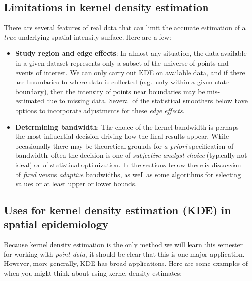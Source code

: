 \documentclass[
]{book}
\providecommand{\tightlist}{%
  \setlength{\itemsep}{0pt}\setlength{\parskip}{0pt}}
\begin{document}
\hypertarget{limitations-in-kernel-density-estimation}{%
\subsection{Limitations in kernel density estimation}\label{limitations-in-kernel-density-estimation}}

There are several features of real data that can limit the accurate estimation of a \emph{true} underlying spatial intensity surface. Here are a few:

\begin{itemize}
\tightlist
\item
  \textbf{Study region and edge effects}: In almost any situation, the data available in a given dataset represents only a subset of the universe of points and events of interest. We can only carry out KDE on available data, and if there are boundaries to where data is collected (e.g.~only within a given state boundary), then the intensity of points near boundaries may be mis-estimated due to missing data. Several of the statistical smoothers below have options to incorporate adjustments for these \emph{edge effects}.
\item
  \textbf{Determining bandwidth}: The choice of the kernel bandwidth is perhaps the most influential decision driving how the final results appear. While occasionally there may be theoretical grounds for \emph{a priori} specification of bandwidth, often the decision is one of \emph{subjective analyst choice} (typically not ideal) or of statistical optimization. In the sections below there is discussion of \emph{fixed} versus \emph{adaptive} bandwidths, as well as some algorithms for selecting values or at least upper or lower bounds.
\end{itemize}

\hypertarget{uses-for-kernel-density-estimation-kde-in-spatial-epidemiology}{%
\subsection{Uses for kernel density estimation (KDE) in spatial epidemiology}\label{uses-for-kernel-density-estimation-kde-in-spatial-epidemiology}}

Because kernel density estimation is the only method we will learn this semester for working with \emph{point data}, it should be clear that this is one major application. However, more generally, KDE has broad applications. Here are some examples of when you might think about using kernel density estimates:
\end{document}
